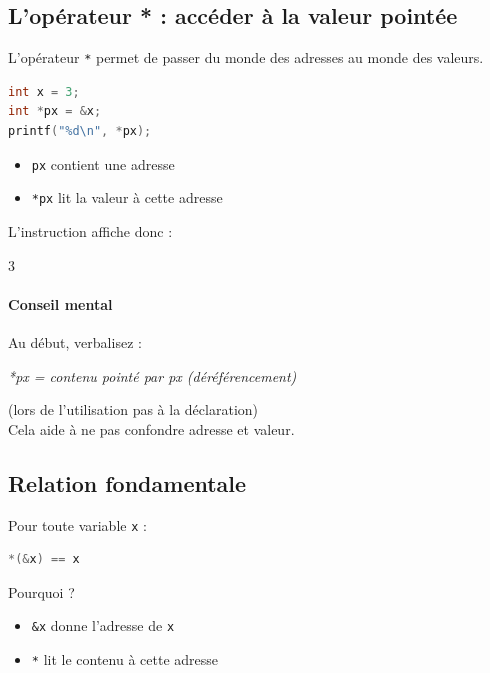 \subsection{L’opérateur * : accéder à la valeur pointée}

L’opérateur \texttt{*} permet de passer du monde des adresses
au monde des valeurs.

\begin{lstlisting}[language=C]
int x = 3;
int *px = &x;
printf("%d\n", *px);
\end{lstlisting}

\begin{itemize}
    \item \texttt{px} contient une adresse
    \item \texttt{*px} lit la valeur à cette adresse
\end{itemize}

L’instruction affiche donc :

\begin{center}
3
\end{center}

\paragraph{Conseil mental}

Au début, verbalisez :

\begin{center}
\textit{*px = contenu pointé par px (déréférencement)}
\end{center}
(lors de l'utilisation pas à la déclaration)\\
Cela aide à ne pas confondre adresse et valeur.

\subsection{Relation fondamentale}

Pour toute variable \texttt{x} :

\begin{lstlisting}[language=C]
*(&x) == x
\end{lstlisting}

Pourquoi ?

\begin{itemize}
    \item \texttt{\&x} donne l’adresse de \texttt{x}
    \item \texttt{*} lit le contenu à cette adresse
\end{itemize}


